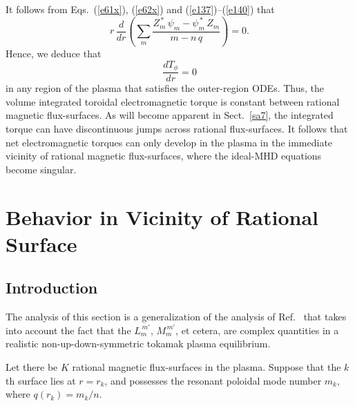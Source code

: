 \documentclass[12pt,prb,aps]{revtex4-1}
\begin{document}
 It follows from Eqs.~(\ref{e61x}), (\ref{e62x}) and (\ref{e137})--(\ref{e140}) that
\begin{equation}\label{e141c}
r\,\frac{d}{dr}\!\left(\sum_{m} \frac{Z_m^{\,\ast}\,\psi_m-\psi_m^{\,\ast}\,Z_m}{m-n\,q}\right)= 0.
\end{equation}
Hence, we deduce that\,\cite{am1}
\begin{equation}\label{etcons}
\frac{dT_\phi}{dr}=0
\end{equation}
in any region of the plasma that satisfies the outer-region ODEs. Thus, the volume integrated toroidal electromagnetic torque is
constant between rational magnetic flux-surfaces. As will become apparent in Sect.~\ref{sa7}, the integrated torque can have discontinuous jumps across rational flux-surfaces. It follows that
net electromagnetic torques can only develop in the plasma in the immediate vicinity of rational magnetic flux-surfaces, where the ideal-MHD equations  become singular. \cite{rfa}

\section{Behavior in Vicinity of Rational Surface}\label{snus}
\subsection{Introduction}
The analysis of this section is a generalization of the analysis of Ref.~ that takes into
account the fact that the $L_m^{\,m'}$, $M_m^{\,m'}$, et cetera, are complex quantities in a realistic non-up-down-symmetric tokamak
plasma equilibrium.

Let there be $K$ rational magnetic flux-surfaces in the plasma. Suppose that the $k$th surface lies at $r=r_k$, and possesses the resonant
poloidal mode number $m_k$, where $q(r_k)=m_k/n$.   
\end{document}
